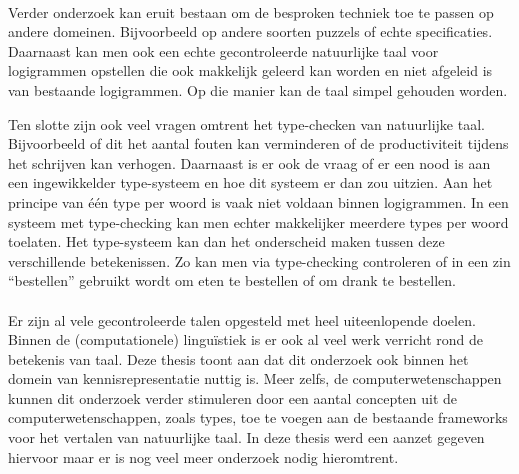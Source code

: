 \paragraph{} Verder onderzoek kan eruit bestaan om de besproken techniek toe te passen op andere domeinen. Bijvoorbeeld op andere soorten puzzels of echte specificaties. Daarnaast kan men ook een echte gecontroleerde natuurlijke taal voor logigrammen opstellen die ook makkelijk geleerd kan worden en niet afgeleid is van bestaande logigrammen. Op die manier kan de taal simpel gehouden worden.

Ten slotte zijn ook veel vragen omtrent het type-checken van natuurlijke taal. Bijvoorbeeld of dit het aantal fouten kan verminderen of de productiviteit tijdens het schrijven kan verhogen. Daarnaast is er ook de vraag of er een nood is aan een ingewikkelder type-systeem en hoe dit systeem er dan zou uitzien. Aan het principe van één type per woord is vaak niet voldaan binnen logigrammen. In een systeem met type-checking kan men echter makkelijker meerdere types per woord toelaten. Het type-systeem kan dan het onderscheid maken tussen deze verschillende betekenissen. Zo kan men via type-checking controleren of in een zin ``bestellen'' gebruikt wordt om eten te bestellen of om drank te bestellen.

\paragraph{} Er zijn al vele gecontroleerde talen opgesteld met heel uiteenlopende doelen. Binnen de (computationele) linguïstiek is er ook al veel werk verricht rond de betekenis van taal. Deze thesis toont aan dat dit onderzoek ook binnen het domein van kennisrepresentatie nuttig is. Meer zelfs, de computerwetenschappen kunnen dit onderzoek verder stimuleren door een aantal concepten uit de computerwetenschappen, zoals types, toe te voegen aan de bestaande frameworks voor het vertalen van natuurlijke taal. In deze thesis werd een aanzet gegeven hiervoor maar er is nog veel meer onderzoek nodig hieromtrent.
